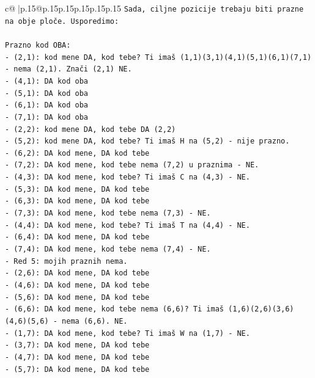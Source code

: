 \documentclass{article}
\begin{document}
{\begin{supertabular}{c@{$\;$}|p{.15\linewidth}@{}p{.15\linewidth}p{.15\linewidth}p{.15\linewidth}p{.15\linewidth}p{.15\linewidth}}
{{{\texttt{Sada, ciljne pozicije trebaju biti prazne na obje ploče. Usporedimo:} \\
\\ 
\texttt{Prazno kod OBA:} \\
\texttt{{-} (2,1): kod mene DA, kod tebe? Ti imaš (1,1)(3,1)(4,1)(5,1)(6,1)(7,1) {-} nema (2,1). Znači (2,1) NE.} \\
\texttt{{-} (4,1): DA kod oba} \\
\texttt{{-} (5,1): DA kod oba} \\
\texttt{{-} (6,1): DA kod oba} \\
\texttt{{-} (7,1): DA kod oba} \\
\texttt{{-} (2,2): kod mene DA, kod tebe DA (2,2)} \\
\texttt{{-} (5,2): kod mene DA, kod tebe? Ti imaš H na (5,2) {-} nije prazno.} \\
\texttt{{-} (6,2): DA kod mene, DA kod tebe} \\
\texttt{{-} (7,2): DA kod mene, kod tebe nema (7,2) u praznima {-} NE.} \\
\texttt{{-} (4,3): DA kod mene, kod tebe? Ti imaš C na (4,3) {-} NE.} \\
\texttt{{-} (5,3): DA kod mene, DA kod tebe} \\
\texttt{{-} (6,3): DA kod mene, DA kod tebe} \\
\texttt{{-} (7,3): DA kod mene, kod tebe nema (7,3) {-} NE.} \\
\texttt{{-} (4,4): DA kod mene, kod tebe? Ti imaš T na (4,4) {-} NE.} \\
\texttt{{-} (6,4): DA kod mene, DA kod tebe} \\
\texttt{{-} (7,4): DA kod mene, kod tebe nema (7,4) {-} NE.} \\
\texttt{{-} Red 5: mojih praznih nema.} \\
\texttt{{-} (2,6): DA kod mene, DA kod tebe} \\
\texttt{{-} (4,6): DA kod mene, DA kod tebe} \\
\texttt{{-} (5,6): DA kod mene, DA kod tebe} \\
\texttt{{-} (6,6): DA kod mene, kod tebe nema (6,6)? Ti imaš (1,6)(2,6)(3,6)(4,6)(5,6) {-} nema (6,6). NE.} \\
\texttt{{-} (1,7): DA kod mene, kod tebe? Ti imaš W na (1,7) {-} NE.} \\
\texttt{{-} (3,7): DA kod mene, DA kod tebe} \\
\texttt{{-} (4,7): DA kod mene, DA kod tebe} \\
\texttt{{-} (5,7): DA kod mene, DA kod tebe} \\
}}}
\end{supertabular}}
\end{document}
